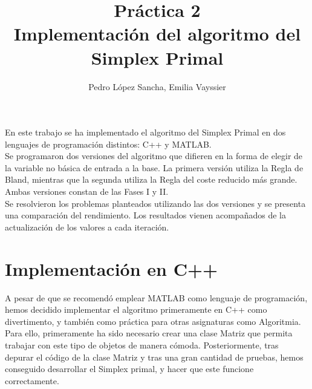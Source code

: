 \documentclass[12pt, titlepage]{article}
\title{Práctica 2\\ 
\large Implementación del algoritmo del Simplex Primal }
\author{Pedro López Sancha, Emilia Vayssier}
\begin{document}
\maketitle

En este trabajo se ha implementado el algoritmo del Simplex Primal en dos lenguajes de programación distintos: C++ y MATLAB. \\
Se programaron dos versiones del algoritmo que difieren en la forma de elegir de la variable no básica de entrada a la base. La primera versión utiliza la Regla de Bland, mientras que la segunda utiliza la Regla del coste reducido más grande. Ambas versiones constan de las Fases I y II. \\
Se resolvieron los problemas planteados utilizando las dos versiones y se presenta una comparación del rendimiento. Los resultados vienen acompañados de la actualización de los valores a cada iteración.
\newpage
\section{Implementación en C++}
A pesar de que se recomendó emplear MATLAB como lenguaje de programación, hemos decidido implementar el algoritmo primeramente en C++ como divertimento, y también como práctica para otras asignaturas como Algoritmia.\\
Para ello, primeramente ha sido necesario crear una clase Matriz que permita trabajar con este tipo de objetos de manera cómoda. Posteriormente, tras depurar el código de la clase Matriz y tras una gran cantidad de pruebas, hemos conseguido desarrollar el Simplex primal, y hacer que este funcione correctamente.
\end{document}
